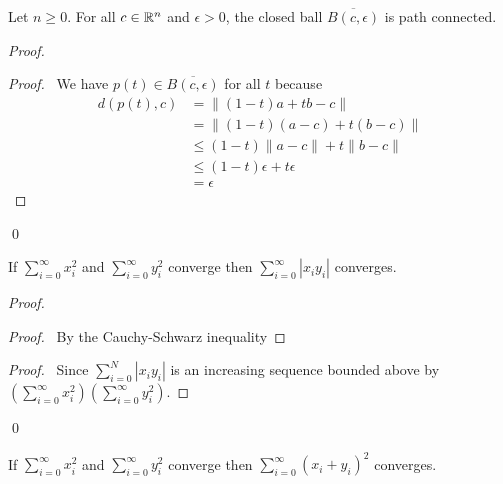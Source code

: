 \begin{proposition}
    Let $n \geq 0$. For all $c \in \mathbb{R}^n$ and $\epsilon > 0$, the closed ball $\overline{B(c,\epsilon)}$ is path connected.
\end{proposition}

\begin{proof}
    \pf
    \begin{proof}
        \pf\ We have $p(t) \in \overline{B(c,\epsilon)}$ for all $t$ because
        \begin{align*}
            d(p(t),c) & = \| (1-t)a + tb - c \| \\
        & = \| (1-t)(a-c) + t(b-c) \| \\
        & \leq (1-t) \| a-c \| + t \| b-c \| \\
        & \leq (1-t) \epsilon + t \epsilon \\
        & = \epsilon
        \end{align*}
    \end{proof}
    \qed
\end{proof}

\begin{lemma}
    If $\sum_{i=0}^\infty x_i^2$ and $\sum_{i=0}^\infty y_i^2$ converge then $\sum_{i=0}^\infty |x_i y_i|$ converges.
\end{lemma}

\begin{proof}
    \pf
    \begin{proof}
        \pf\ By the Cauchy-Schwarz inequality
    \end{proof}
    \qedstep
    \begin{proof}
        \pf\ Since $\sum_{i=0}^N |x_i y_i|$ is an increasing sequence bounded above by \\ $(\sum_{i=0}^\infty x_i^2) (\sum_{i=0}^\infty y_i^2)$.
    \end{proof}
    \qed
\end{proof}

\begin{corollary}
    \label{corollary:l2_sum_converge}
    If $\sum_{i=0}^\infty x_i^2$ and $\sum_{i=0}^\infty y_i^2$ converge then $\sum_{i=0}^\infty (x_i + y_i)^2$ converges.
\end{corollary}

